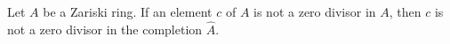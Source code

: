 Let $A$ be a Zariski ring. If an element $c$ of $A$ is not a zero divisor in $A$, then $c$ is not a zero divisor in the completion $\hat{A}$.